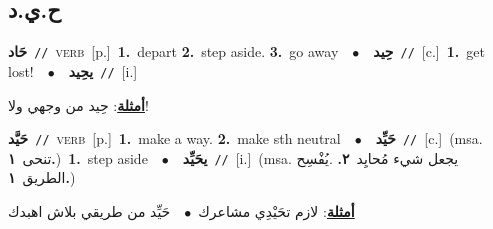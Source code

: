 \documentclass[10pt,a4paper,twoside]{article} %
\begin{document}
\begin{multicols}{2}
\vspace{-3mm}
\subsection*{\color{blue}\foreignlanguage{arabic}{ح.ي.د}\color{blue}{}} 

{\setlength\topsep{0pt}\textbf{\foreignlanguage{arabic}{حَاد}}\ {\color{gray}\texttt{//}\color{black}}\ \textsc{verb}\ [p.]\ \textbf{1.}~depart  \textbf{2.}~step aside.  \textbf{3.}~go away\ \ $\bullet$\ \ \setlength\topsep{0pt}\textbf{\foreignlanguage{arabic}{حِيد}}\ {\color{gray}\texttt{//}\color{black}}\ [c.]\ \textbf{1.}~get lost!\ \ $\bullet$\ \ \setlength\topsep{0pt}\textbf{\foreignlanguage{arabic}{يحِيد}}\ {\color{gray}\texttt{//}\color{black}}\ [i.]\  \begin{flushright}\color{gray}\foreignlanguage{arabic}{\textbf{\underline{\foreignlanguage{arabic}{أمثلة}}}: حِيد من وجهي ولا!}\end{flushright}\color{black}} \vspace{2mm}

{\setlength\topsep{0pt}\textbf{\foreignlanguage{arabic}{حَيَّد}}\ {\color{gray}\texttt{//}\color{black}}\ \textsc{verb}\ [p.]\ \textbf{1.}~make a way.  \textbf{2.}~make sth neutral\ \ $\bullet$\ \ \setlength\topsep{0pt}\textbf{\foreignlanguage{arabic}{حَيِّد}}\ {\color{gray}\texttt{//}\color{black}}\ [c.]\ \color{gray}(msa. \foreignlanguage{arabic}{تنحى}~\foreignlanguage{arabic}{\textbf{١.}})\color{black}\ \textbf{1.}~step aside\ \ $\bullet$\ \ \setlength\topsep{0pt}\textbf{\foreignlanguage{arabic}{يحَيِّد}}\ {\color{gray}\texttt{//}\color{black}}\ [i.]\ \color{gray}(msa. \foreignlanguage{arabic}{يجعل شيء مُحايِد}~\foreignlanguage{arabic}{\textbf{٢.}}  .\foreignlanguage{arabic}{يُفْسِح الطريق}~\foreignlanguage{arabic}{\textbf{١.}})\color{black}\  \begin{flushright}\color{gray}\foreignlanguage{arabic}{\textbf{\underline{\foreignlanguage{arabic}{أمثلة}}}: لازم تحَيْدِي مشاعرك\ $\bullet$\ \  حَيِّد من طريقي بلاش اهبدك}\end{flushright}\color{black}} \vspace{2mm}


\end{multicols}
\end{document}
